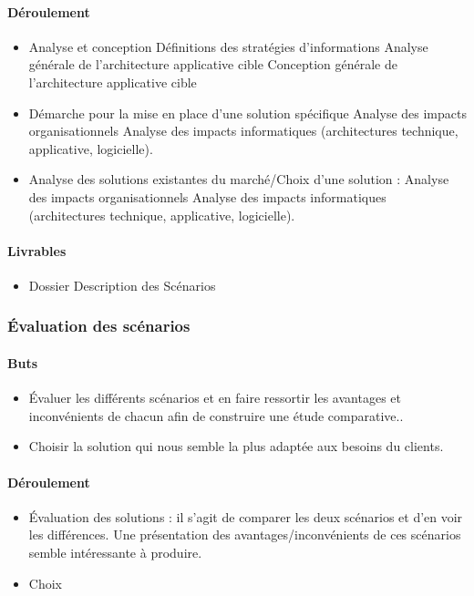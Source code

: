 \paragraph{Déroulement}
\begin{itemize}
    \item Analyse et conception
        \subitem Définitions des stratégies d’informations
        \subitem Analyse générale de l’architecture applicative cible
        \subitem Conception générale de l’architecture applicative cible
    \item Démarche pour la mise en place d’une solution spécifique
        \subitem Analyse des impacts organisationnels
        \subitem Analyse des impacts informatiques (architectures technique, applicative, logicielle).
    \item Analyse  des solutions existantes du marché/Choix d’une solution :
        \subitem Analyse des impacts organisationnels
        \subitem Analyse des impacts informatiques (architectures technique, applicative, logicielle).
\end{itemize}

\paragraph{Livrables}
\begin{itemize}
    \item Dossier Description des Scénarios
\end{itemize}

\subsubsection{Évaluation des scénarios}

\paragraph{Buts}
\begin{itemize}
    \item Évaluer les différents scénarios et en faire ressortir les avantages et inconvénients de chacun afin de construire une étude comparative..
    \item Choisir la solution qui nous semble la plus adaptée aux besoins du clients.
\end{itemize}

\paragraph{Déroulement}
\begin{itemize}
    \item Évaluation des solutions : il s’agit de comparer les deux scénarios et d’en voir les différences. Une présentation des avantages/inconvénients de ces scénarios semble intéressante à produire.
    \item Choix
\end{itemize}

